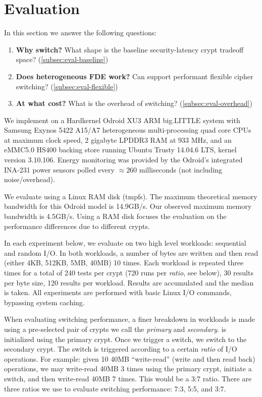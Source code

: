 \section{Evaluation}\label{sec:eval}

In this section we answer the following questions:

\begin{enumerate}
 \item {\bf Why switch?} What shape is the baseline security-latency crypt
 tradeoff space? (\cref{subsec:eval-baseline})
 \item {\bf Does heterogeneous FDE work?} Can \sys support performant flexible
 cipher switching? (\cref{subsec:eval-flexible})
 \item {\bf At what cost?} What is the overhead of switching?
 (\cref{subsec:eval-overhead})
\end{enumerate}

 We implement \sys on a Hardkernel Odroid XU3 ARM
big.LITTLE system with Samsung Exynos 5422 A15/A7 heterogeneous multi-processing
quad core CPUs at maximum clock speed, 2 gigabyte LPDDR3 RAM at 933 MHz, and an
eMMC5.0 HS400 backing store running Ubuntu Trusty 14.04.6 LTS, kernel version
3.10.106. Energy monitoring was provided by the Odroid's integrated INA-231
power sensors polled every $\approx{260}$ milliseconds (not including
noise/overhead).

We evaluate \sys using a Linux RAM disk (tmpfs). The maximum theoretical memory
bandwidth for this Odroid model is 14.9GB/s\@. Our observed maximum memory
bandwidth is 4.5GB/s. Using a RAM disk focuses the evaluation on the performance
differences due to different crypts.

 In each experiment below, we evaluate \sys on two high
level workloads: sequential and random I/O. In both workloads, a number of bytes
are written and then read (either 4KB, 512KB, 5MB, 40MB) 10 times. Each workload
is repeated three times for a total of 240 tests per crypt (720 runs per {\em
ratio}, see below), 30 results per byte size, 120 results per workload. Results
are accumulated and the median is taken. All experiments are performed with
basic Linux I/O commands, bypassing system caching.

When evaluating switching performance, a finer breakdown in workloads is made
using a pre-selected pair of crypts we call the {\em primary} and {\em
secondary}. \sys is initialized using the primary crypt. Once we trigger a
switch, we switch to the secondary crypt. The switch is triggered according to a
certain {\em ratio} of I/O operations. For example: given 10 40MB ``write-read''
(write and then read back) operations, we may write-read 40MB 3 times using the
primary crypt, initiate a switch, and then write-read 40MB 7 times. This would
be a 3:7 ratio. There are three ratios we use to evaluate switching performance:
7:3, 5:5, and 3:7.


